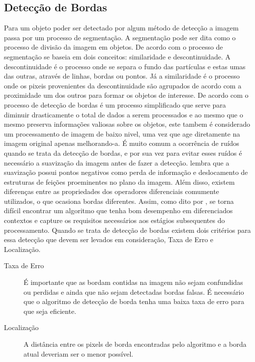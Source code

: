 \subsection{Detecção de Bordas}
Para um objeto poder ser detectado por algum método de detecção a imagem passa por um processo de segmentação. A segmentação pode ser dita como o processo de divisão da imagem em objetos\cite{Gonzalez:2008}. De acordo com  o processo de segmentação se baseia em dois conceitos: similaridade e descontinuidade. A descontinuidade é o processo onde se separa o fundo das partículas e estas umas das outras, através de linhas, bordas ou pontos. Já a similaridade é o processo onde os pixeis provenientes da descontinuidade são agrupados de acordo com a proximidade um dos outros para formar os objetos de interesse. De acordo com  o processo de detecção de bordas é um processo simplificado que serve para diminuir drasticamente o total de dados a serem processados e ao mesmo que o mesmo preserva informações valiosas sobre os objetos, este tambem é considerado um processamento de imagem de baixo nivel, uma vez que age diretamente na imagem original apenas melhorando-a. É muito comum a ocorrência de ruídos quando se trata da detecção de bordas, e por sua vez para evitar esses ruídos é necessário a suavização da imagem antes de fazer a detecção.  lembra que a suavização possui pontos negativos como perda de informação e deslocamento de estruturas de feições proeminentes no plano da imagem. Além disso, existem diferenças entre as propriedades dos operadores diferenciais comumente utilizados, o que ocasiona  bordas diferentes. Assim, como dito por , se torna difícil encontrar um algoritmo que tenha bom desempenho em diferenciados contextos e capture os requisitos necessários aos estágios subsequentes do processamento. 
Quando se trata de detecção de bordas existem dois critérios\cite{Canny:1986} para essa detecção que devem ser levados em consideração, Taxa de Erro e Localização\cite{Vale:2002}. 
\begin{description}
	\item[Taxa de Erro] É importante que as bordam contidas na imagem não sejam confundidas ou perdidas e ainda que não sejam detectadas bordas falsas. É necessário que o algoritmo de detecção de borda tenha uma baixa taxa de erro para que seja eficiente\cite{Wangenheim:2014, Canny:1986, Vale:2002}.
	\item[Localização] A distância entre os pixels de borda encontradas pelo algoritmo e a borda atual deveriam ser o menor possível\cite{Wangenheim:2014}.
\end{description}
